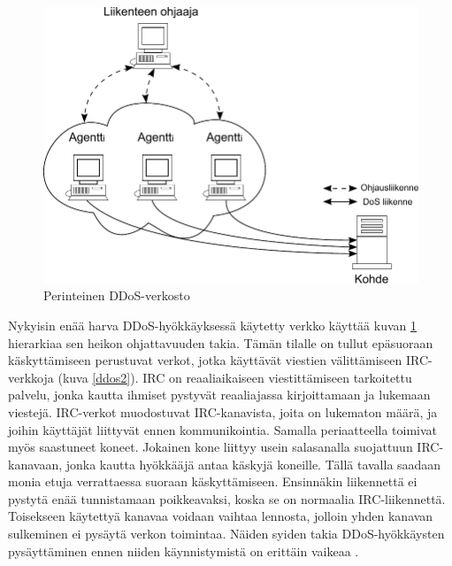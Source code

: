 \begin{figure}[htp]
\centering
\includegraphics[width=12cm]{pics/perinteinen_ddos.pdf}
\caption{Perinteinen DDoS-verkosto}
\label{ddos1}
\end{figure}

Nykyisin enää harva DDoS-hyökkäyksessä käytetty verkko käyttää kuvan \ref{ddos1}
hierarkiaa sen heikon ohjattavuuden takia. Tämän tilalle on tullut
epäsuoraan käskyttämiseen perustuvat verkot, jotka käyttävät viestien
välittämiseen IRC-verkkoja (kuva \ref{ddos2}). IRC on reaaliaikaiseen viestittämiseen
tarkoitettu palvelu, jonka kautta ihmiset pystyvät reaaliajassa kirjoittamaan
ja lukemaan viestejä. IRC-verkot muodostuvat IRC-kanavista, joita on lukematon
määrä, ja joihin käyttäjät liittyvät ennen kommunikointia. Samalla
periaatteella toimivat myös saastuneet koneet. Jokainen kone liittyy usein
salasanalla suojattuun IRC-kanavaan, jonka kautta hyökkääjä antaa käskyjä
koneille. Tällä tavalla saadaan monia etuja verrattaessa suoraan käskyttämiseen.
Ensinnäkin liikennettä ei pystytä enää tunnistamaan poikkeavaksi, koska se on
normaalia IRC-liikennettä. Toisekseen käytettyä kanavaa voidaan vaihtaa
lennosta, jolloin yhden kanavan sulkeminen ei pysäytä verkon toimintaa. Näiden
syiden takia DDoS-hyökkäysten pysäyttäminen ennen niiden käynnistymistä on
erittäin vaikeaa \cite{DDOS}.


